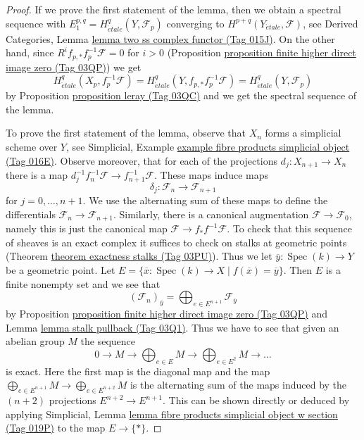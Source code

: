 \documentclass{amsart}
\theoremstyle{plain}
\theoremstyle{definition}
\theoremstyle{remark}
\numberwithin{equation}{subsection}
\def\Spec{\mathop{\mathrm{Spec}}}
\def\etale{{\acute{e}tale}}
\begin{document}
\begin{proof}
If we prove the first statement of the lemma, then we obtain a spectral
sequence with $E_1^{p, q} = H^q_\etale(Y, \mathcal{F}_p)$ converging
to $H^{p + q}(Y_\etale, \mathcal{F})$, see
Derived Categories, Lemma \href{https://stacks.math.columbia.edu/tag/015J}{lemma two ss complex functor (Tag 015J)}.
On the other hand, since
$R^if_{p, *}f_p^{-1}\mathcal{F} = 0$ for $i > 0$
(Proposition \href{https://stacks.math.columbia.edu/tag/03QP}{proposition finite higher direct image zero (Tag 03QP)})
we get
$$
H^q_\etale(X_p, f_p^{-1}\mathcal{F}) =
H^q_\etale(Y, f_{p, *}f_p^{-1} \mathcal{F}) =
H^q_\etale(Y, \mathcal{F}_p)
$$
by Proposition \href{https://stacks.math.columbia.edu/tag/03QC}{proposition leray (Tag 03QC)}
and we get the spectral sequence of the lemma.

\medskip\noindent
To prove the first statement of the lemma, observe that
$X_n$ forms a simplicial scheme over $Y$, see
Simplicial, Example \href{https://stacks.math.columbia.edu/tag/016E}{example fibre products simplicial object (Tag 016E)}.
Observe moreover, that for each of the projections
$d_j : X_{n + 1} \to X_n$ there is a map
$d_j^{-1} f_n^{-1}\mathcal{F} \to f_{n + 1}^{-1}\mathcal{F}$.
These maps induce maps
$$
\delta_j : \mathcal{F}_n \to \mathcal{F}_{n + 1}
$$
for $j = 0, \ldots, n + 1$. We use the alternating sum of these maps
to define the differentials $\mathcal{F}_n \to \mathcal{F}_{n + 1}$.
Similarly, there is a canonical augmentation $\mathcal{F} \to \mathcal{F}_0$,
namely this is just the canonical map $\mathcal{F} \to f_*f^{-1}\mathcal{F}$.
To check that this sequence of sheaves is an exact complex it suffices
to check on stalks at geometric points (Theorem \href{https://stacks.math.columbia.edu/tag/03PU}{theorem exactness stalks (Tag 03PU)}).
Thus we let $\overline{y} : \Spec(k) \to Y$ be a geometric point. Let
$E = \{\overline{x} : \Spec(k) \to X \mid f(\overline{x}) = \overline{y}\}$.
Then $E$ is a finite nonempty set and we see that
$$
(\mathcal{F}_n)_{\overline{y}} =
\bigoplus\nolimits_{e \in E^{n + 1}} \mathcal{F}_{\overline{y}}
$$
by Proposition \href{https://stacks.math.columbia.edu/tag/03QP}{proposition finite higher direct image zero (Tag 03QP)}
and Lemma \href{https://stacks.math.columbia.edu/tag/03Q1}{lemma stalk pullback (Tag 03Q1)}.
Thus we have to see that given an abelian group $M$ the sequence
$$
0 \to M \to \bigoplus\nolimits_{e \in E} M \to
\bigoplus\nolimits_{e \in E^2} M \to \ldots
$$
is exact. Here the first map is the diagonal map and the map
$\bigoplus_{e \in E^{n + 1}} M  \to \bigoplus_{e \in E^{n + 2}} M$
is the alternating sum of the maps induced by the $(n + 2)$
projections $E^{n + 2} \to E^{n + 1}$. This can be shown directly
or deduced by applying Simplicial, Lemma
\href{https://stacks.math.columbia.edu/tag/019P}{lemma fibre products simplicial object w section (Tag 019P)}
to the map $E \to \{*\}$.
\end{proof}
\end{document}
